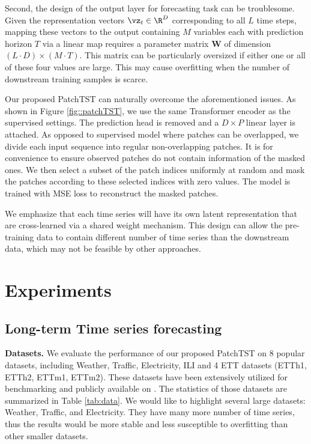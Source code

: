 \documentclass{article} %
\begin{document}

Second, the design of the output layer for forecasting task can be troublesome. Given the representation vectors  $\vz_t \in \R^D$ corresponding to all $L$ time steps, mapping these vectors to the output containing $M$ variables each with prediction horizon $T$ via a linear map requires a parameter matrix $\mathbf{W}$ of dimension $(L \cdot D) \times (M \cdot T)$. This matrix can be particularly oversized if either one or all of these four values are large. This may cause overfitting when the number of downstream training samples is scarce. 

Our proposed PatchTST can naturally overcome the aforementioned issues. As shown in Figure \ref{fig::patchTST}, we use the same Transformer encoder as the supervised settings. The prediction head is removed and a $D \times P$ linear layer is attached. As opposed to supervised model where patches can be overlapped, we divide each input sequence into regular non-overlapping patches. It is for convenience to ensure observed patches do not contain information of the masked ones. We then select a subset of the patch indices uniformly at random and mask the patches according to these selected indices with zero values. The model is trained with MSE loss to reconstruct the masked patches.

We emphasize that each time series will have its own latent representation that are cross-learned via a shared weight mechanism. This design can allow the pre-training data to contain different number of time series than the downstream data, which may not be feasible by other approaches. 


\section{Experiments}

\subsection{Long-term Time series forecasting}
\label{subsection::time series forecasting}

\textbf{Datasets.} We evaluate the performance of our proposed PatchTST on $8$ popular datasets, including Weather, Traffic, Electricity, ILI and 4 ETT datasets (ETTh1, ETTh2, ETTm1, ETTm2). These datasets have been extensively utilized for benchmarking and publicly available on \citep{autoformer}. The statistics of those datasets are summarized in Table \ref{tab:data}. We would like to highlight several large datasets: Weather, Traffic, and Electricity. They have many more number of time series, thus the results would be more stable and less susceptible to overfitting than other smaller datasets.
\end{document}
